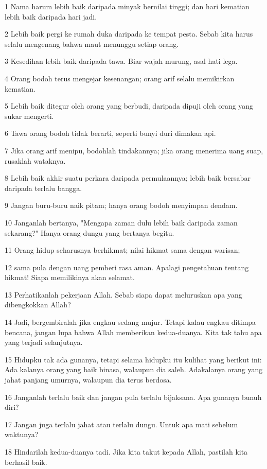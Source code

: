 \par 1 Nama harum lebih baik daripada minyak bernilai tinggi; dan hari kematian lebih baik daripada hari jadi.
\par 2 Lebih baik pergi ke rumah duka daripada ke tempat pesta. Sebab kita harus selalu mengenang bahwa maut menunggu setiap orang.
\par 3 Kesedihan lebih baik daripada tawa. Biar wajah murung, asal hati lega.
\par 4 Orang bodoh terus mengejar kesenangan; orang arif selalu memikirkan kematian.
\par 5 Lebih baik ditegur oleh orang yang berbudi, daripada dipuji oleh orang yang sukar mengerti.
\par 6 Tawa orang bodoh tidak berarti, seperti bunyi duri dimakan api.
\par 7 Jika orang arif menipu, bodohlah tindakannya; jika orang menerima uang suap, rusaklah wataknya.
\par 8 Lebih baik akhir suatu perkara daripada permulaannya; lebih baik bersabar daripada terlalu bangga.
\par 9 Jangan buru-buru naik pitam; hanya orang bodoh menyimpan dendam.
\par 10 Janganlah bertanya, "Mengapa zaman dulu lebih baik daripada zaman sekarang?" Hanya orang dungu yang bertanya begitu.
\par 11 Orang hidup seharusnya berhikmat; nilai hikmat sama dengan warisan;
\par 12 sama pula dengan uang pemberi rasa aman. Apalagi pengetahuan tentang hikmat! Siapa memilikinya akan selamat.
\par 13 Perhatikanlah pekerjaan Allah. Sebab siapa dapat meluruskan apa yang dibengkokkan Allah?
\par 14 Jadi, bergembiralah jika engkau sedang mujur. Tetapi kalau engkau ditimpa bencana, jangan lupa bahwa Allah memberikan kedua-duanya. Kita tak tahu apa yang terjadi selanjutnya.
\par 15 Hidupku tak ada gunanya, tetapi selama hidupku itu kulihat yang berikut ini: Ada kalanya orang yang baik binasa, walaupun dia saleh. Adakalanya orang yang jahat panjang umurnya, walaupun dia terus berdosa.
\par 16 Janganlah terlalu baik dan jangan pula terlalu bijaksana. Apa gunanya bunuh diri?
\par 17 Jangan juga terlalu jahat atau terlalu dungu. Untuk apa mati sebelum waktunya?
\par 18 Hindarilah kedua-duanya tadi. Jika kita takut kepada Allah, pastilah kita berhasil baik.
